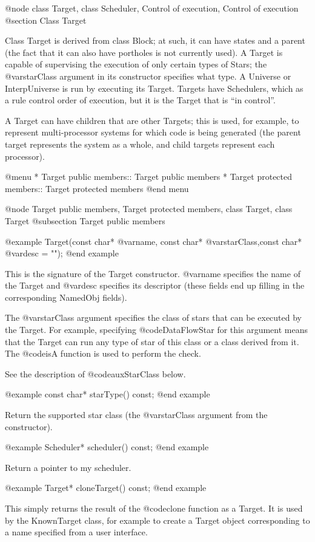@node class Target, class Scheduler, Control of execution, Control of execution
@section Class Target

Class Target is derived from class Block; at such, it can have states
and a parent (the fact that it can also have portholes is not currently
used).  A Target is capable of supervising the execution of only certain
types of Stars; the @var{starClass} argument in its constructor
specifies what type.  A Universe or InterpUniverse is run by executing
its Target.  Targets have Schedulers, which as a rule control order of
execution, but it is the Target that is ``in control''.

A Target can have children that are other Targets; this is used, for
example, to represent multi-processor systems for which code is being
generated (the parent target represents the system as a whole, and
child targets represent each processor).

@menu
* Target public members::       Target public members
* Target protected members::    Target protected members
@end menu

@node Target public members, Target protected members, class Target, class Target
@subsection Target public members

@example
Target(const char* @var{name}, const char* @var{starClass},const char* @var{desc} = "");
@end example

This is the signature of the Target constructor. @var{name} specifies
the name of the Target and @var{desc} specifies its descriptor (these
fields end up filling in the corresponding NamedObj fields).

The @var{starClass} argument specifies the class of stars that can be
executed by the Target.  For example, specifying @code{DataFlowStar}
for this argument means that the Target can run any type of star of
this class or a class derived from it.  The @code{isA} function is
used to perform the check.

See the description of @code{auxStarClass} below.

@example
const char* starType() const;
@end example

Return the supported star class (the @var{starClass} argument from
the constructor).

@example
Scheduler* scheduler() const;
@end example

Return a pointer to my scheduler.

@example
Target* cloneTarget() const;
@end example

This simply returns the result of the @code{clone} function as a Target.
It is used by the KnownTarget class, for example to create a Target
object corresponding to a name specified from a user interface.

